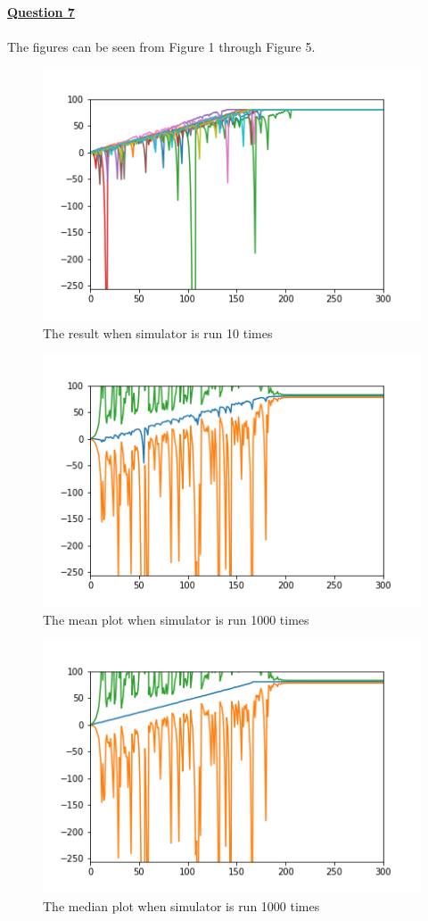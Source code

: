 \documentclass{article}
\begin{document}
\underline{\textbf{Question 7}}
\\
\\
The figures can be seen from Figure 1 through Figure 5. 
\begin{figure}
\includegraphics[]{plot.png}
\caption{The result when simulator is run 10 times}
\end{figure}
\begin{figure}
\includegraphics[]{plot2.png}
\caption{The mean plot when simulator is run 1000 times}
\end{figure}
\begin{figure}
\includegraphics[]{plot3.png}
\caption{The median plot when simulator is run 1000 times}
\end{figure}
\end{document}
